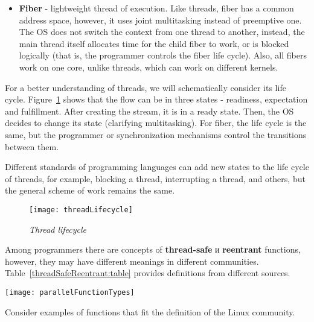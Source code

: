 {\begin{itemize}
			\item\textbf{Fiber} - lightweight thread of execution. Like threads, fiber has a common address space, however, it uses joint multitasking instead of preemptive one. The OS does not switch the context from one thread to another, instead, the main thread itself allocates time for the child fiber to work, or is blocked logically (that is, the programmer controls the fiber life cycle). Also, all fibers work on one core, unlike threads, which can work on different kernels.
		\end{itemize}
	\par For a better understanding of threads, we will schematically consider its life cycle. Figure~\ref{threadLifecycle:image} shows that the flow can be in three states - readiness, expectation and fulfillment. After creating the stream, it is in a ready state. Then, the OS decides to change its state (clarifying multitasking). For fiber, the life cycle is the same, but the programmer or synchronization mechanisms control the transitions between them.
	\par Different standards of programming languages can add new states to the life cycle of threads, for example, blocking a thread, interrupting a thread, and others, but the general scheme of work remains the same.
		\begin{figure}[H]
			\texttt{[image: threadLifecycle]}
			\caption{\textit{Thread lifecycle}}
			\label{threadLifecycle:image}
		\end{figure}
	\par Among programmers there are concepts of \textbf{thread-safe} и \textbf{reentrant} functions, however, they may have different meanings in different communities. Table~\ref{threadSafeReentrant:table} provides definitions from different sources.
	\begin{table}[H]
		\caption{Definitions of thread-safe and reentrant functions}
		\label{threadSafeReentrant:table}
		\begin{center}
					\texttt{[image: parallelFunctionTypes]}
		\end{center}
	\end{table}
	\par Consider examples of functions that fit the definition of the Linux community.
}

